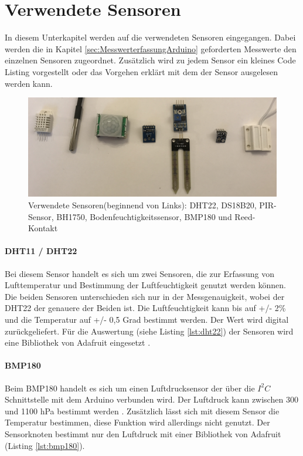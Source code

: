 \section{Verwendete Sensoren}
\label{sec:VerwendeteSensoren}
In diesem Unterkapitel werden auf die verwendeten Sensoren eingegangen. Dabei werden die in Kapitel \ref{sec:MesswerterfassungArduino} geforderten Messwerte den einzelnen Sensoren zugeordnet. Zusätzlich wird zu jedem Sensor ein kleines Code Listing vorgestellt oder das Vorgehen erklärt mit dem der Sensor ausgelesen werden kann.
\begin{figure}
	\centering
	\includegraphics[width=1\textwidth]{bilder/sensoren}
	\caption[Verwendete Sensoren]{Verwendete Sensoren(beginnend von Links): DHT22, DS18B20, PIR-Sensor, BH1750, Bodenfeuchtigkeitssensor, BMP180  und Reed-Kontakt}
	\label{img:verwendeteSensoren}
\end{figure}

\paragraph{DHT11 / DHT22} Bei diesem Sensor handelt es sich um zwei Sensoren, die zur Erfassung von Lufttemperatur und Bestimmung der Luftfeuchtigkeit genutzt werden können. Die beiden Sensoren unterschieden sich nur in der Messgenauigkeit, wobei der DHT22 der genauere der Beiden ist. Die Luftfeuchtigkeit kann bis auf +/- 2\% und die Temperatur auf +/- 0,5 Grad bestimmt werden. Der Wert wird digital zurückgeliefert. Für die Auswertung (siehe Listing \ref{lst:dht22}) der Sensoren wird eine Bibliothek von Adafruit eingesetzt \cite{adafruit2016dht}.



\paragraph{BMP180} Beim BMP180 handelt es sich um einen Luftdrucksensor der über die $I^2C$ Schnittstelle mit dem Arduino verbunden wird. Der Luftdruck kann zwischen 300 und 1100 hPa bestimmt werden \cite{sensortec2013data}. Zusätzlich lässt sich mit diesem Sensor die Temperatur bestimmen, diese Funktion wird allerdings nicht genutzt. Der Sensorknoten bestimmt nur den Luftdruck mit einer Bibliothek von Adafruit (Listing \ref{lst:bmp180}). 


